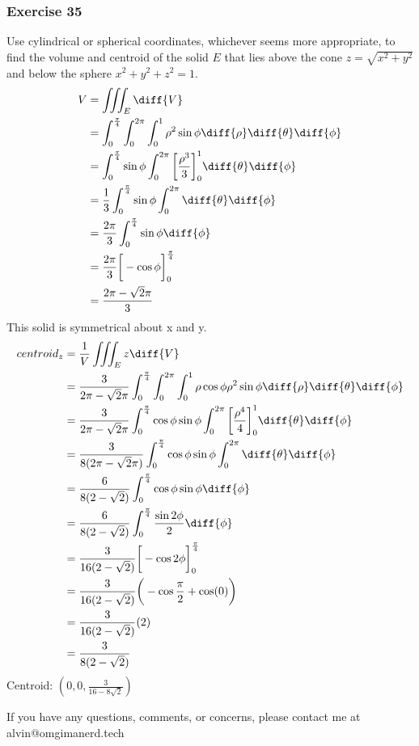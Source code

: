 \documentclass{math}
\begin{document}
\subsubsection*{Exercise 35}
Use cylindrical or spherical coordinates, whichever seems more appropriate, to
find the volume and centroid of the solid \( E \) that lies above the cone
\( z = \sqrt{x^2+y^2} \) and below the sphere \( x^2+y^2+z^2 = 1 \).
\begin{align*}
  V &= \iiint_{E}\diff{V} \\
  &= \int_{0}^{\frac{\pi}{4}}\int_{0}^{2\pi}\int_{0}^{1}\rho^2\sin\phi
    \diff{\rho}\diff{\theta}\diff{\phi} \\
  &= \int_{0}^{\frac{\pi}{4}}\sin\phi\int_{0}^{2\pi}
    \bigg[\frac{\rho^3}{3}\bigg]_{0}^{1}\diff{\theta}\diff{\phi} \\
  &= \frac{1}{3}\int_{0}^{\frac{\pi}{4}}\sin\phi\int_{0}^{2\pi}
    \diff{\theta}\diff{\phi} \\
  &= \frac{2\pi}{3}\int_{0}^{\frac{\pi}{4}}\sin\phi\diff{\phi} \\
  &= \frac{2\pi}{3}\bigg[-\cos\phi\bigg]_{0}^{\frac{\pi}{4}} \\
  &= \frac{2\pi-\sqrt{2}\pi}{3}
\end{align*}
This solid is symmetrical about x and y.
\begin{align*}
  centroid_z &= \frac{1}{V}\iiint_{E}z\diff{V} \\
  &= \frac{3}{2\pi-\sqrt{2}\pi}\int_{0}^{\frac{\pi}{4}}\int_{0}^{2\pi}
    \int_{0}^{1}\rho\cos\phi\rho^2\sin\phi\diff{\rho}\diff{\theta}\diff{\phi} \\
  &= \frac{3}{2\pi-\sqrt{2}\pi}\int_{0}^{\frac{\pi}{4}}\cos\phi\sin\phi
    \int_{0}^{2\pi}\bigg[\frac{\rho^4}{4}\bigg]_{0}^{1}
    \diff{\theta}\diff{\phi} \\
  &= \frac{3}{8(2\pi-\sqrt{2}\pi)}\int_{0}^{\frac{\pi}{4}}\cos\phi\sin\phi
    \int_{0}^{2\pi}\diff{\theta}\diff{\phi} \\
  &= \frac{6}{8(2-\sqrt{2})}\int_{0}^{\frac{\pi}{4}}\cos\phi\sin\phi
    \diff{\phi} \\
  &= \frac{6}{8(2-\sqrt{2})}\int_{0}^{\frac{\pi}{4}}\frac{\sin2\phi}{2}
    \diff{\phi} \\
  &= \frac{3}{16(2-\sqrt{2})}
    \bigg[-\cos2\phi\bigg]_{0}^{\frac{\pi}{4}} \\
  &= \frac{3}{16(2-\sqrt{2})}\bigg(-\cos\frac{\pi}{2}+\cos(0)\bigg) \\
  &= \frac{3}{16(2-\sqrt{2})}(2) \\
  &= \frac{3}{8(2-\sqrt{2})} \\
\end{align*}
Centroid: \( (0,0,\frac{3}{16-8\sqrt{2}}) \)

\begin{center}
  If you have any questions, comments, or concerns, please contact me at
  alvin@omgimanerd.tech
\end{center}
\end{document}
